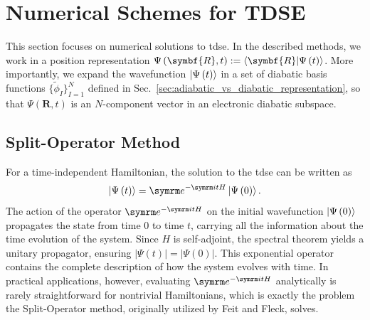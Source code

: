 \section{Numerical Schemes for TDSE}\label{sec:numerical_schemes_for_time_dependent_schrodinger_equation}
This section focuses on numerical solutions to \gls{tdse}. In the described methods, we work in a position representation $\Psi\left(\symbf{R},t\right):=\braket{\symbf{R}\vert\Psi\left(t\right)}$. More importantly, we expand the wavefunction $\ket{\Psi\left(t\right)}$ in a set of diabatic basis functions $\lbrace\tilde\phi_I\rbrace_{I=1}^N$ defined in Sec.~\ref{sec:adiabatic_vs_diabatic_representation}, so that $\Psi\left(\symbf{R},t\right)$ is an $N$-component vector in an electronic diabatic subspace.
\subsection{Split-Operator Method}\label{sec:split_operator_method}
For a time-independent Hamiltonian, the solution to the \gls{tdse} can be written as
\begin{equation}\label{eq:tdse_propagator}
\ket{\Psi\left(t\right)}=\e^{-\i tH}\ket{\Psi\left(0\right)}.
\end{equation}
The action of the operator $\e^{-\i tH}$ on the initial wavefunction $\ket{\Psi\left(0\right)}$ propagates the state from time $0$ to time $t$, carrying all the information about the time evolution of the system. Since $H$ is self-adjoint, the spectral theorem yields a unitary propagator, ensuring $\lvert\Psi(t)\rvert=\lvert\Psi(0)\rvert$. This exponential operator contains the complete description of how the system evolves with time. In practical applications, however, evaluating $\e^{-\i tH}$ analytically is rarely straightforward for nontrivial Hamiltonians, which is exactly the problem the Split-Operator method, originally utilized by Feit and Fleck, solves.\supercite{10.1063/1.447051}

